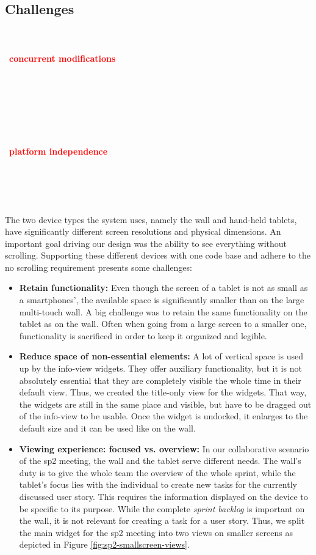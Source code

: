 \documentclass{sigchi}
\newcommand{\todo}[1]{~\\\\~\textbf{\large{\textcolor{red}{#1}}}\\~\\~\\~\\~}
\begin{document}
\subsection{Challenges}

\todo{concurrent modifications}

\todo{platform independence}

The two device types the system uses, namely the wall and hand-held tablets, have significantly different screen resolutions and physical dimensions. 
An important goal driving our design was the ability to see everything without scrolling.
Supporting these different devices with one code base and adhere to the no scrolling requirement presents some challenges:

\begin{itemize}
	\item \textbf{Retain functionality:} 
	Even though the screen of a tablet is not as small as a smartphones', the available space is significantly smaller than on the large multi-touch wall. 
	A big challenge was to retain the same functionality on the tablet as on the wall. Often when going from a large screen to a smaller one, functionality is sacrificed in order to  keep it organized and legible.
	
	\item \textbf{Reduce space of non-essential elements:}
	A lot of vertical space is used up by the info-view widgets.
	They offer auxiliary functionality, but it is not absolutely essential that they are completely visible the whole time in their default view.
	Thus, we created the title-only view for the widgets.
	That way, the widgets are still in the same place and visible, but have to be dragged out of the info-view to be usable.
	Once the widget is undocked, it enlarges to the default size and it can be used like on the wall.
	
	\item \textbf{Viewing experience: focused vs. overview:}
	In our collaborative scenario of the \gls{sp2} meeting, the wall and the tablet serve different needs.
	The wall's duty is to give the whole team the overview of the whole sprint, while the tablet's focus lies with the individual to create new tasks for the currently discussed user story.
	This requires the information displayed on the device to be specific to its purpose.
	While the complete \textit{sprint backlog} is important on the wall, it is not relevant for creating a task for a user story.
	Thus, we split the main widget for the \gls{sp2} meeting into two views on smaller screens as depicted in Figure \ref{fig:sp2-smallscreen-views}.
	
\end{itemize}
\end{document}
